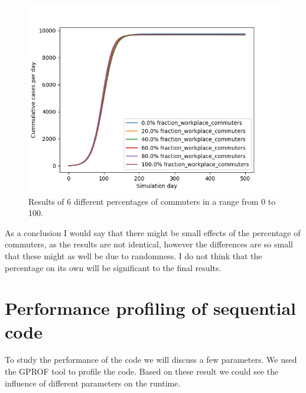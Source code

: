 \documentclass[runningheads]{llncs}
\begin{document}
	\begin{figure}
		\includegraphics[width=\textwidth]{commuting_cumul.png}
		\caption{Results of 6 different percentages of commuters in a range from 0 to 100.}
	\end{figure}

	\noindent
	As a conclusion I would say that there might be small effects of the percentage of commuters, as the results are not identical, however the differences are so small that these might as well be due to randomness. I do not think that the percentage on its own will be significant to the final results.
	
	\newpage
	\section{Performance profiling of sequential code}
To study the performance of the code we will discuss a few parameters. We used the GPROF tool to profile the code. Based on these result we could see the influence of different parameters on the runtime.
\end{document}
